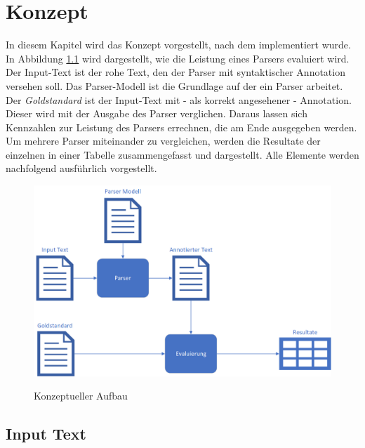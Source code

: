 %
\chapter{Konzept}
\label{sec:konzept}

In diesem Kapitel wird das Konzept vorgestellt, nach dem implementiert wurde. In Abbildung \ref{fig:konzept-aufbau} wird dargestellt, wie die Leistung eines Parsers evaluiert wird. Der Input-Text ist der rohe Text, den der Parser mit syntaktischer Annotation versehen soll. Das Parser-Modell ist die Grundlage auf der ein Parser arbeitet. Der \textit{Goldstandard} ist der Input-Text mit - als korrekt angesehener - Annotation. Dieser wird mit der Ausgabe des Parser verglichen. Daraus lassen sich Kennzahlen zur Leistung des Parsers errechnen, die am Ende ausgegeben werden.
Um mehrere Parser miteinander zu vergleichen, werden die Resultate der einzelnen in einer Tabelle zusammengefasst und dargestellt. Alle Elemente werden nachfolgend ausführlich vorgestellt. 
\begin{figure} [h]

\includegraphics[width=\textwidth]{gfx/konzept-aufbau-png.png} 
\label{fig:konzept-aufbau}	
\caption{Konzeptueller Aufbau}	
\end{figure}
		
\section{Input Text}

